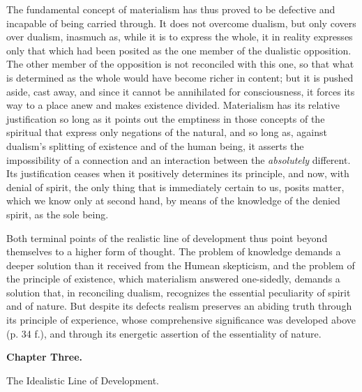 The fundamental concept of materialism has thus proved to be defective
and incapable of being carried through. It does not overcome dualism,
but only covers over dualism, inasmuch as, while it is to express the
whole, it in reality expresses only that which had been
posited as the one member of the dualistic opposition. The other member
of the opposition is not reconciled with this one, so that what is
determined as the whole would have become richer in content; but it is
pushed aside, cast away, and since it cannot be annihilated for
consciousness, it forces its way to a place anew and makes existence
divided. Materialism has its relative justification so long as it
points out the emptiness in those concepts of the spiritual that express
only negations of the natural,
and so long as, against dualism's splitting of existence and of the
human being, it asserts the impossibility of a connection and an
interaction between the \emph{absolutely} different. Its justification
ceases when it positively determines its principle, and now, with
denial of spirit, the only thing that is immediately certain to us,
posits matter, which we know only at second hand, by means of the
knowledge of the denied spirit, as the sole being.

\divrule

Both terminal points of the realistic line of development thus point
beyond themselves to a higher form of thought. The problem of knowledge
demands a deeper solution than it received from the Humean skepticism,
and the problem of the principle of existence, which materialism
answered one-sidedly, demands a solution that, in reconciling dualism,
recognizes the essential peculiarity of spirit and of nature. But
despite its defects realism preserves an abiding truth through its
principle of experience, whose comprehensive significance was developed
above (p. 34 f.), and through its energetic assertion of the
essentiality of nature.

\divrule

\begin{center}
  \textbf{Chapter Three.}
\end{center}

\divrule

\begin{center}
  {\large The Idealistic Line of Development.}
\end{center}

\divrule

